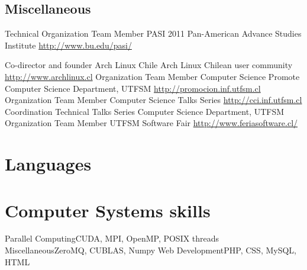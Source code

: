 \documentclass[11pt,a4paper]{moderncv}
\begin{document}
\subsection{Miscellaneous}
		{Technical Organization Team Member}
		{PASI 2011}
		{Pan-American Advance Studies Institute}
		{\url{http://www.bu.edu/pasi/}}
		{}

		{Co-director and founder}
		{Arch Linux Chile}
		{Arch Linux Chilean user community}
		{\url{http://www.archlinux.cl}}
		{}
		{Organization Team Member}
		{Computer Science Promote}
		{Computer Science Department, UTFSM}
		{\url{http://promocion.inf.utfsm.cl}}
		{}
		{Organization Team Member}
		{Computer Science Talks Series}
		{\url{http://cci.inf.utfsm.cl}}
		{}{}
		{Coordination}
		{Technical Talks Series}
		{Computer Science Department, UTFSM}
		{}{}
        {Organization Team Member}
        {UTFSM Software Fair}
        {\url{http://www.feriasoftware.cl/}}
        {}{}

\section{Languages}

\section{Computer Systems skills}
           {Parallel Computing}{CUDA, MPI, OpenMP, POSIX threads}
           {Miscellaneous}{ZeroMQ, CUBLAS, Numpy}
           {Web Development}{PHP, CSS, MySQL, HTML}
\end{document}

